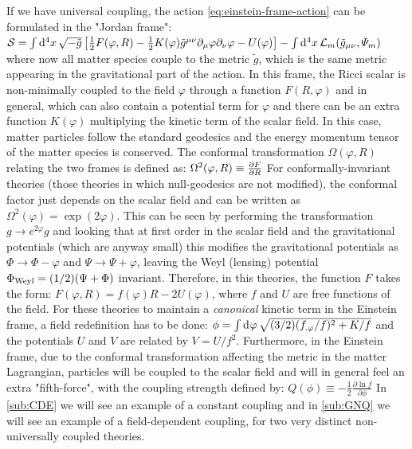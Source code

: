 If we have universal coupling, the action \cref{eq:einstein-frame-action} can be formulated in the "Jordan frame":
\beeqc$\label{eq:jordan-frame-action}
\mathcal{S} = \int \mathrm{d}^{4} {x} \, \sqrt{-\tilde{g}} \left[  \frac{1}{2} F(\varphi, R) - \frac{1}{2} K(\varphi) \tilde{g}^{\mu \nu}  \partial_{\mu}\varphi \partial_{\nu}\varphi 
- U(\varphi)    \right] - \int \mathrm{d}^{4} {x} \, \mathcal{L}_m (\tilde{g}_{\mu \nu} , \varPsi_m )
$
where now all matter species couple to the metric $\tilde g$, which is the same metric appearing in the gravitational part of the action.
In this frame, the Ricci scalar is non-minimally coupled to the field $\varphi$ through a function $F(R, \varphi)$ and in general, 
which can also contain a potential term for $\varphi$ and there can be an extra function $K(\varphi)$ multiplying the kinetic term of the scalar field.
In this case, matter particles follow the standard geodesics and the energy momentum tensor of the matter species is conserved.
The conformal transformation $\Omega(\varphi,R)$ relating the two frames is defined as:
\beeqp$
\Omega^2(\varphi,R) \equiv \frac{\partial{F}}{\partial{R}} 
$
For conformally-invariant theories (those theories in which null-geodesics are not modified), the conformal factor
just depends on the scalar field and can be written as $\Omega^2(\varphi)=\exp(2\varphi)$. 
This can be seen by performing the transformation $g \rightarrow e^{2\varphi} g$ and 
looking that at first order in the
scalar field and the gravitational potentials (which are anyway small)
this modifies the gravitational potentials as $\Phi \rightarrow \Phi-\varphi$ and $\Psi \rightarrow \Psi+\varphi$, leaving 
the Weyl (lensing) potential $\Phi_{\rm Weyl} = (1/2)(\Psi + \Phi)$ invariant.
Therefore, in this theories, the function $F$ takes the form: $F(\varphi, R) = f(\varphi)R-2U(\varphi)$, where
$f$ and $U$ are free functions of the field.
For these theories to maintain a \emph{canonical} kinetic term in the Einstein frame, a field redefinition has to be done:
\beeq$
\phi = \int \mathrm{d}^{} {\varphi} \, \sqrt{(3/2)(f_{,\varphi}/f)^2 + K/f}
$
and the potentials $U$ and $V$ are related by $V = U/f^2$.
Furthermore, in the Einstein frame, due to the conformal transformation affecting the metric in the matter Lagrangian,
particles will be coupled to the scalar field and will in general feel an extra "fifth-force", with the coupling strength
defined by:
\beeqp$\label{eq:definition-of-coupling-Q}
Q(\phi) \equiv -\frac{1}{2}\frac{\partial \ln f}{\partial \phi}
$
In \cref{sub:CDE} we will see an example of a constant coupling and in \cref{sub:GNQ} we will see an example of a field-dependent coupling, 
for two very distinct non-universally coupled theories.

